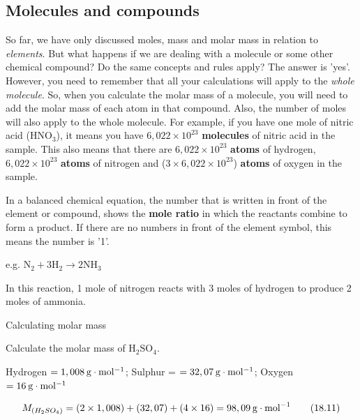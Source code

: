             \subsection*{Molecules and compounds}
            \nopagebreak
      \label{m38717*id278284}So far, we have only discussed moles, mass and molar mass in relation to \textsl{elements}. But what happens if we are dealing with a molecule or some other chemical compound? Do the same concepts and rules apply? The answer is 'yes'. However, you need to remember that all your calculations will apply to the \textsl{whole molecule}. So, when you calculate the molar mass of a molecule, you will need to add the molar mass of each atom in that compound. Also, the number of moles will also apply to the whole molecule. For example, if you have one mole of nitric acid ($\mathrm{HNO}{}_{3}$), it means you have $6,022\ensuremath{\times}{10}^{23}$ \textbf{molecules} of nitric acid in the sample. This also means that there are $6,022\ensuremath{\times}{10}^{23}$ \textbf{atoms} of hydrogen, $6,022\ensuremath{\times}{10}^{23}$ \textbf{atoms} of nitrogen and ($3\ensuremath{\times}6,022\ensuremath{\times}{10}^{23}$) \textbf{atoms} of oxygen in the sample.\par 
      \label{m38717*id278429}In a balanced chemical equation, the number that is written in front of the element or compound, shows the \textbf{mole ratio} in which the reactants combine to form a product. If there are no numbers in front of the element symbol, this means the number is '1'.\par 
      \label{m38717*id278442}e.g. ${\mathrm{N}}_{2}+3{\mathrm{H}}_{2}\to 2\mathrm{N}{\mathrm{H}}_{3}$\par 
      \label{m38717*id278488}In this reaction, 1 mole of nitrogen reacts with 3 moles of hydrogen to produce 2 moles of ammonia.\par 
\label{m38717*secfhsst!!!underscore!!!id566}\vspace{.5cm} 
      \begin{wex}{Calculating molar mass }{
      \label{m38717*probfhsst!!!underscore!!!id567}
      \label{m38717*id278505}Calculate the molar mass of $\mathrm{H}{}_{2}\mathrm{SO}{}_{4}$.\par 
      \vspace{5pt}}
{
      \label{m38717*id278575}Hydrogen $=1,008\phantom{\rule{2pt}{0ex}}\mathrm{g}\ensuremath{\cdot}\mathrm{mol}{}^{-1}$; Sulphur = $=32,07\phantom{\rule{2pt}{0ex}}\mathrm{g}\ensuremath{\cdot}\mathrm{mol}{}^{-1}$; Oxygen $=16\phantom{\rule{2pt}{0ex}}\mathrm{g}\ensuremath{\cdot}\mathrm{mol}{}^{-1}$\par 
      \label{m38717*id278632}\nopagebreak\noindent{}
    \begin{equation}
    {M}_{\left({H}_{2}S{O}_{4}\right)}=\left(2\ensuremath{\times}1,008\right)+\left(32,07\right)+\left(4\ensuremath{\times}16\right)=98,09\phantom{\rule{2pt}{0ex}}\mathrm{g}\ensuremath{\cdot}{\mathrm{mol}}^{-1}\tag{18.11}
      \end{equation}
}
    \end{wex}
